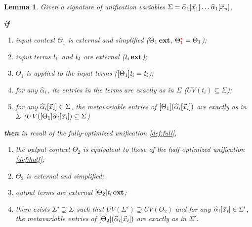 \documentclass[a4,natbib=false]{article}
\newtheorem{lemma}{Lemma}
\begin{document}
\begin{lemma}
  Given a signature of unification variables $\Sigma = \widehat{\alpha}_{{\mathrm{1}}}  [  \vec{x}_{{\mathrm{1}}}  ] \dots \widehat{\alpha}_{{\mathrm{1}}}  [  \vec{x}_{\mathit{n}}  ]$,

  \textbf{if}
  \begin{enumerate}
    \item input context $ \Theta_{{\mathrm{1}}} $  is external and simplified ($ \Theta_{{\mathrm{1}}} \, \mathbf{ext}
      $,  $  \Theta_{{\mathrm{1}}} ^{\color{red}\star}  = \Theta_{{\mathrm{1}}} $);
    \item input terms $ \mathit{t_{{\mathrm{1}}}} $ and $ \mathit{t_{{\mathrm{2}}}} $ are external ($ \mathit{t_{\mathit{i}}} \, \mathbf{ext} $);
    \item $ \Theta_{{\mathrm{1}}} $ is applied to the input terms ($ [  \Theta_{{\mathrm{1}}}  ]  \mathit{t_{\mathit{i}}} = \mathit{t_{\mathit{i}}} $);
    \item for any $ \widehat{\alpha}_{\mathit{i}} $, its entries in the terms are exactly as in
      $\Sigma$ ($UV(t_i) \subseteq \Sigma$);
    \item for any $ \widehat{\alpha}_{\mathit{i}}  [  \vec{x}_{\mathit{i}}  ] \in \Sigma $, the metavariable entries of 
      $ [  \Theta_{{\mathrm{1}}}  ]  (  \widehat{\alpha}_{\mathit{i}}  [  \vec{x}_{\mathit{i}}  ]  ) $ are exactly as in $\Sigma$ ($UV([  \Theta_{{\mathrm{1}}}  ]  \widehat{\alpha}_{\mathit{i}}  [  \vec{x}_{\mathit{i}}  ]) \subseteq \Sigma$)
  \end{enumerate}

  \textbf{then} in result of the fully-optimized unification \ref{def:full},
    \begin{enumerate}
    \item the output context $ \Theta_{{\mathrm{2}}} $  is equivalent to those of the
      half-optimized unification \ref{def:half};
    \item $ \Theta_{{\mathrm{2}}} $ is external and simplified;
    \item output terms are external $ [  \Theta_{{\mathrm{2}}}  ]  \mathit{t_{\mathit{i}}} \, \mathbf{ext} $;
    \item there exists $\Sigma' \supseteq \Sigma$ such that 
      $UV(\Sigma') \supseteq UV( \Theta_{{\mathrm{2}}} )$ and
      for any $ \widehat{\alpha}_{\mathit{i}}  [  \vec{x}_{\mathit{i}}  ] \in \Sigma' $, the metavariable entries of 
      $ [  \Theta_{{\mathrm{2}}}  ]  (  \widehat{\alpha}_{\mathit{i}}  [  \vec{x}_{\mathit{i}}  ]  ) $ are exactly as in $\Sigma'$.
  \end{enumerate}
  
\end{lemma}
\end{document}
